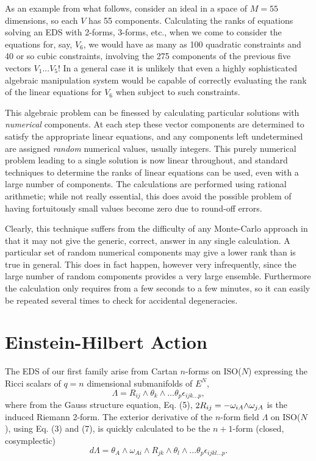 \documentclass[a4paper,a4paper]{article}
\begin{document}
        As an example from what follows,  consider an ideal in a space
of $M = 55$ dimensions,  so each $V$ has 55 components.  Calculating the
ranks of equations solving an EDS with  2-forms,  3-forms,  etc.,   when we come to
consider the equations for,  say,  ${V_6}$,  we would have as many as
100 quadratic constraints and 40 or so cubic constraints,  involving the 275
components of the previous five vectors ${V_1}...{V_5}$!   In a general
case it is unlikely that even a highly sophisticated algebraic manipulation
system would be capable of correctly evaluating the rank of the linear
equations for ${V_6}$ when subject to such constraints.

  This algebraic problem can be finessed by calculating particular
solutions with {\itshape numerical  }components.  At each step these
vector components are determined to satisfy the appropriate linear equations,  and any
components left undetermined are assigned {\itshape random} numerical
values, usually integers.  This purely numerical problem leading to a single
solution is now linear throughout,  and standard techniques to determine
the ranks of linear equations can be used,  even with a large number of
components.  The calculations are performed using rational arithmetic;
while not really essential,  this does avoid the possible problem of having
fortuitously small values become zero due to round-off errors.

        Clearly,  this technique suffers from the difficulty of any
Monte-Carlo approach in that it may not give the generic,  correct,
answer in any single calculation.  A particular set of random numerical components may  give
a lower rank than is true in general. This does in fact happen,
however very infrequently,  since the large number of random components
provides a very large ensemble.  Furthermore the calculation only
requires from a few seconds to a few minutes,  so it can easily be repeated
several times to check for accidental degeneracies.

\section{Einstein-Hilbert Action}

        The  EDS of our first family arise from Cartan $n$-forms on
ISO($N$) expressing the Ricci scalars of $q = n$ dimensional
submanifolds of ${E^N}$,
\begin{equation}
\Lambda  = {R_{{ij}}}\wedge {{\theta }_k}\wedge ...{{\theta }_p}
{{\epsilon }_{{ijk}...p}},
\end{equation}
where from the Gauss structure equation,  Eq. (5),  $2{R_{{ij}}} =
-{{\omega }_{{iA}}}\wedge \)\({{\omega }_{{jA}}}$
is the induced Riemann 2-form.   The exterior derivative of the $n$-form
field $\Lambda $ on ISO($N$),  using Eq. (3) and (7),  is quickly
calculated to be the $n + 1$-form (closed,  cosymplectic)
\begin{equation}
{d\Lambda } = {{\theta }_A}\wedge {{\omega }_{{Ai}}}\wedge
{R_{{jk}}}\wedge {{\theta
}_l}\wedge ...{{\theta }_p} {{\epsilon }_{{ijkl}...p}}.
\end{equation}
\end{document}
